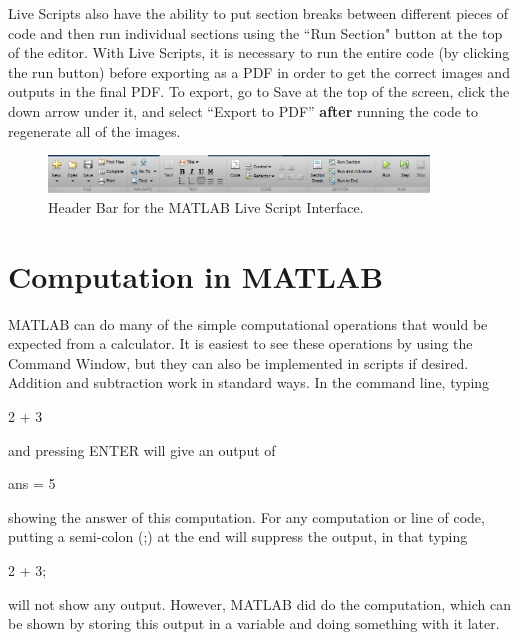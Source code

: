 Live Scripts also have the ability to put section breaks between different pieces of code and then run individual sections using the ``Run Section" button at the top of the editor. With Live Scripts, it is necessary to run the entire code (by clicking the run button) before exporting as a PDF in order to get the correct images and outputs in the final PDF. To export, go to Save at the top of the screen, click the down arrow under it, and select ``Export to PDF'' \textbf{after} running the code to regenerate all of the images.

\begin{figure}[h]
    \centering
    \includegraphics[width=0.9\textwidth]{Images/MatlabLiveScript_HeaderBar.png}
    \caption{Header Bar for the MATLAB Live Script Interface.}
    \label{fig:MatlabDemo_LSHead}
\end{figure}

\section{Computation in MATLAB}

MATLAB can do many of the simple computational operations that would be expected from a calculator. It is easiest to see these operations by using the Command Window, but they can also be implemented in scripts if desired. Addition and subtraction work in standard ways. In the command line, typing
\begin{matlab}
2 + 3
\end{matlab}%
\noindent and pressing ENTER will give an output of
\begin{matlab}
ans = 
    5
\end{matlab}
showing the answer of this computation. For any computation or line of code, putting a semi-colon (;) at the end will suppress the output, in that typing
\begin{matlab}
2 + 3;
\end{matlab}
will not show any output. However, MATLAB did do the computation, which can be shown by storing this output in a variable and doing something with it later. 

